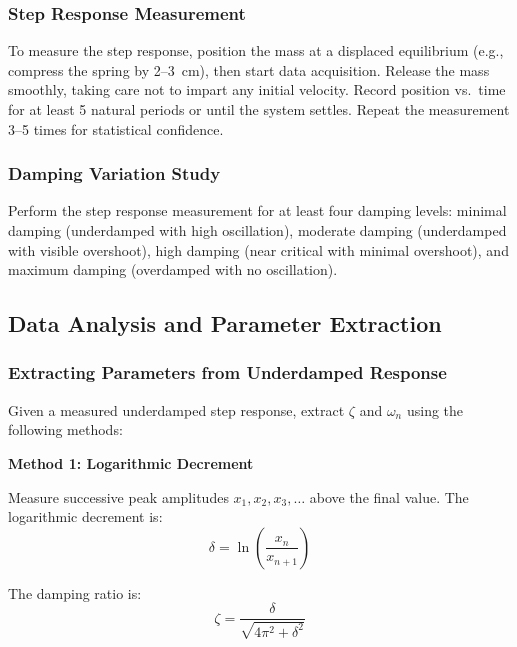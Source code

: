 \subsubsection{Step Response Measurement}

To measure the step response, position the mass at a displaced equilibrium (e.g., compress the spring by 2--3~cm), then start data acquisition. Release the mass smoothly, taking care not to impart any initial velocity. Record position vs.\ time for at least 5 natural periods or until the system settles. Repeat the measurement 3--5 times for statistical confidence.

\subsubsection{Damping Variation Study}

Perform the step response measurement for at least four damping levels: minimal damping (underdamped with high oscillation), moderate damping (underdamped with visible overshoot), high damping (near critical with minimal overshoot), and maximum damping (overdamped with no oscillation).

\subsection{Data Analysis and Parameter Extraction}

\subsubsection{Extracting Parameters from Underdamped Response}

Given a measured underdamped step response, extract $\zeta$ and $\omega_n$ using the following methods:

\textbf{Method 1: Logarithmic Decrement}

Measure successive peak amplitudes $x_1, x_2, x_3, \ldots$ above the final value. The logarithmic decrement is:
\begin{equation}
\delta = \ln\left(\frac{x_n}{x_{n+1}}\right)
\end{equation}

The damping ratio is:
\begin{equation}
\zeta = \frac{\delta}{\sqrt{4\pi^2 + \delta^2}}
\end{equation}

